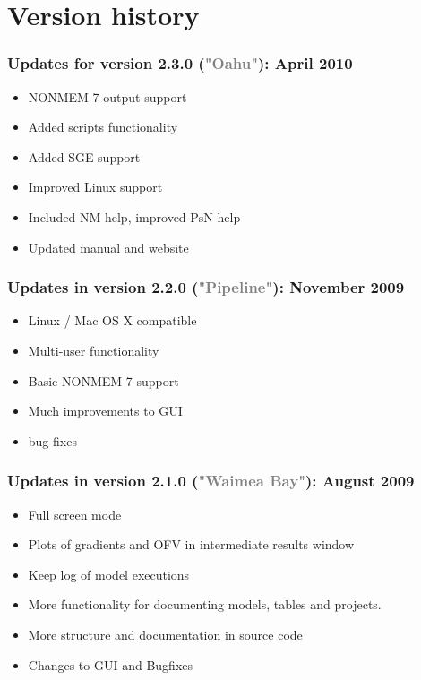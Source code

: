 \documentclass[a4,11pt]{report} \usepackage[pdftex]{graphicx}
\begin{document}
{{{{\section{Version history}
\subsubsection*{Updates for version 2.3.0 (\textcolor{Grey}{"Oahu"}):
April 2010}
\begin{itemize} \scriptsize
  \item NONMEM 7 output support
  \item Added scripts functionality
  \item Added SGE support
  \item Improved Linux support
  \item Included NM help, improved PsN help
  \item Updated manual and website
\end{itemize}

\subsubsection*{Updates in version 2.2.0
(\textcolor{Grey}{"Pipeline"}): November 2009}
\begin{itemize} \scriptsize
  \item Linux / Mac OS X compatible
  \item Multi-user functionality
  \item Basic NONMEM 7 support
  \item Much improvements to GUI
  \item bug-fixes
\end{itemize}

\subsubsection*{Updates in version 2.1.0 (\textcolor{Grey}{"Waimea
Bay"}): August 2009}
\begin{itemize} \scriptsize
  \item Full screen mode
  \item Plots of gradients and OFV in intermediate results window
  \item Keep log of model executions
  \item More functionality for documenting models, tables and
projects.
  \item More structure and documentation in source code
  \item Changes to GUI and Bugfixes
\end{itemize}

}}}}
\end{document}
